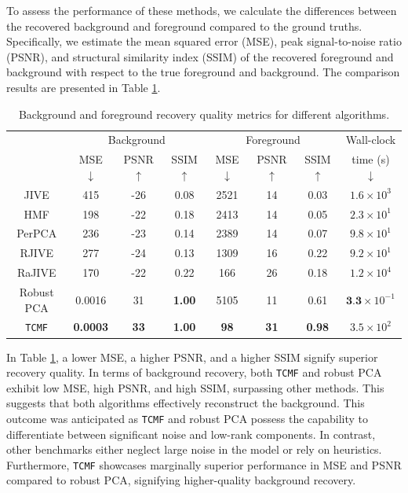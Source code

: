 \documentclass[twoside,11pt]{article}
\def\name{\texttt{TCMF}\xspace}
\begin{document}
To assess the performance of these methods, we calculate the differences between the recovered background and foreground compared to the ground truths. Specifically, we estimate the mean squared error (MSE), peak signal-to-noise ratio (PSNR), and structural similarity index (SSIM) of the recovered foreground and background with respect to the true foreground and background. The comparison results are presented in Table \ref{tab:videometrics}.
\begin{table}[htbp]
  \centering
  \caption{Background and foreground recovery quality metrics for different algorithms.}
\begin{tabular}{cccccccc}
\toprule
          & \multicolumn{3}{c}{Background} & \multicolumn{3}{c}{Foreground} & Wall-clock \\
          & MSE $\downarrow$   & PSNR $\uparrow$ & SSIM $\uparrow$ & MSE $\downarrow$  & PSNR $\uparrow$ & SSIM $\uparrow$ & time (s) $\downarrow$\\
          \hline
    JIVE  & 415   & -26   & 0.08  & 2521  & 14    & 0.03 & $1.6\times 10^3$ \\
    HMF   & 198   & -22   & 0.18  & 2413  & 14    & 0.05 & $2.3\times 10^1$\\
    
    PerPCA   & 236   & -23   & 0.14  & 2389  & 14    & 0.07 & $9.8\times 10^1$\\
    RJIVE & 277   & -24   & 0.13  & 1309  & 16    & 0.22 & $9.2\times 10^1$\\
    RaJIVE &  170     &   -22    &    0.22   &   166    &   26    &  0.18 & $1.2\times 10^4$\\
    Robust PCA &  0.0016     &   31    &    \textbf{1.00}   &   5105    &   11    &  0.61 & $\textbf{3.3}\times 10^{-1}$\\
    \name  & \textbf{0.0003} & \textbf{33}    & \textbf{1.00}     & \textbf{98 }   & \textbf{31}    & \textbf{0.98} & $3.5\times 10^2$\\
    \bottomrule
    \end{tabular}%
  \label{tab:videometrics}%
\end{table}%

In Table \ref{tab:videometrics}, a lower MSE, a higher PSNR, and a higher SSIM signify superior recovery quality. In terms of background recovery, both \name and robust PCA exhibit low MSE, high PSNR, and high SSIM, surpassing other methods. This suggests that both algorithms effectively reconstruct the background. This outcome was anticipated as \name and robust PCA possess the capability to differentiate between significant noise and low-rank components. In contrast, other benchmarks either neglect large noise in the model or rely on heuristics. Furthermore, \name showcases marginally superior performance in MSE and PSNR compared to robust PCA, signifying higher-quality background recovery.
\end{document}
